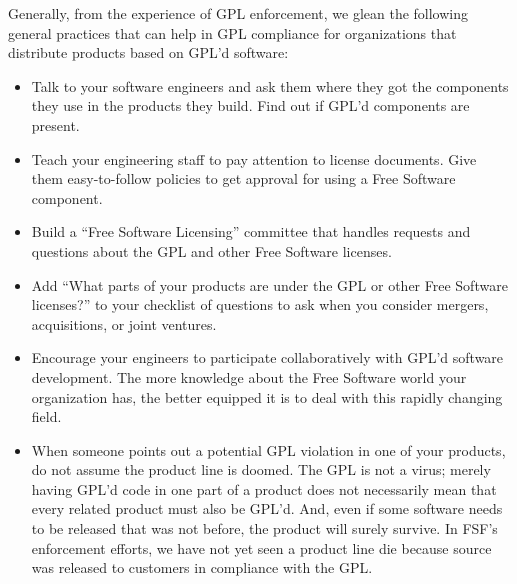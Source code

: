 Generally, from the experience of GPL enforcement, we glean the following
general practices that can help in GPL compliance for organizations that
distribute products based on GPL'd software:

\begin{itemize}

\item Talk to your software engineers and ask them where they got the
  components they use in the products they build. Find out if GPL'd
  components are present.

\item Teach your engineering staff to pay attention to license documents.
  Give them easy-to-follow policies to get approval for using a Free
  Software component.

\item Build a ``Free Software Licensing'' committee that handles requests
  and questions about the GPL and other Free Software licenses.

\item Add ``What parts of your products are under the GPL or other Free
  Software licenses?'' to your checklist of questions to ask when you
  consider mergers, acquisitions, or joint ventures.

\item Encourage your engineers to participate collaboratively with GPL'd
  software development. The more knowledge about the Free Software world
  your organization has, the better equipped it is to deal with this
  rapidly changing field.

\item When someone points out a potential GPL violation in one of your
  products, do not assume the product line is doomed. The GPL is not a virus;
  merely having GPL'd code in one part of a product does not necessarily
  mean that every related product must also be GPL'd. And, even if some
  software needs to be released that was not before, the product will
  surely survive. In FSF's enforcement efforts, we have not yet
  seen a product line die because source was released to customers in
  compliance with the GPL.

\end{itemize}

